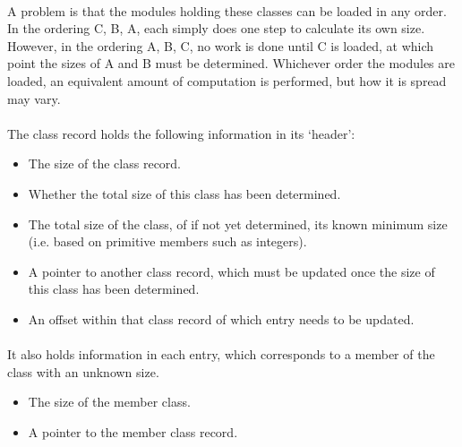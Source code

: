 \documentclass{article}
\begin{document}
\paragraph{}
A problem is that the modules holding these classes can be loaded in any order. In the ordering C, B, A, each simply does one step to calculate its own size. However, in the ordering A, B, C, no work is done until C is loaded, at which point the sizes of A and B must be determined. Whichever order the modules are loaded, an equivalent amount of computation is performed, but how it is spread may vary.

\paragraph{}
The class record holds the following information in its `header':

\begin{itemize}
\item The size of the class record.
\item Whether the total size of this class has been determined.
\item The total size of the class, of if not yet determined, its known minimum size (i.e. based on primitive members such as integers).
\item A pointer to another class record, which must be updated once the size of this class has been determined.
\item An offset within that class record of which entry needs to be updated.
\end{itemize}

\paragraph{}
It also holds information in each entry, which corresponds to a member of the class with an unknown size.

\begin{itemize}
\item The size of the member class.
\item A pointer to the member class record.
\end{itemize}
\end{document}
